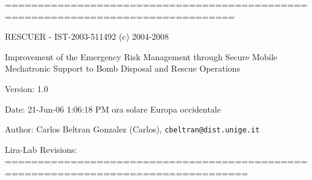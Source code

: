 =================================================================================

RESCUER - IST-2003-511492 (c) 2004-2008

Improvement of the Emergency Risk Management through Secure Mobile Mechatronic Support to Bomb Disposal and Rescue Operations

\begin{Desc}
\item[Version:]1.0 \end{Desc}
\begin{Desc}
\item[Date:]21-Jun-06 1:06:18 PM ora solare Europa occidentale \end{Desc}
\begin{Desc}
\item[Author:]Carlos Beltran Gonzalez (Carlos), {\tt cbeltran@dist.unige.it} 

Lira-Lab Revisions: ===================================================================================\end{Desc}
